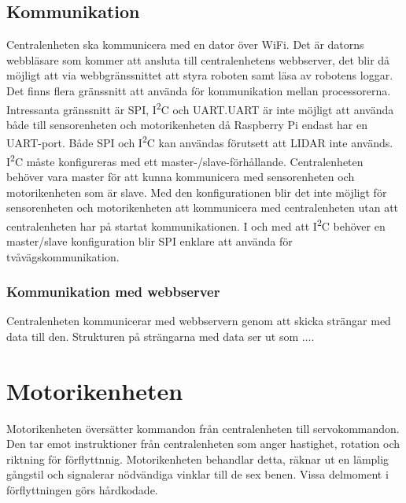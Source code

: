 \documentclass[a4paper,titlepage,12pt]{article}
\newcommand{\itc}{I\textsuperscript{2}C}
\begin{document}
	\subsection{Kommunikation}
	Centralenheten ska kommunicera med en dator över WiFi. Det är datorns webbläsare 
	som kommer att ansluta till centralenhetens webbserver, det blir då möjligt att
	via webbgränssnittet att styra roboten samt läsa av robotens loggar. Det finns
	flera gränssnitt att 
	använda för kommunikation mellan processorerna. Intressanta gränssnitt är SPI, 
	\itc{} och UART.\@ UART är inte möjligt att använda både till sensorenheten och 
	motorikenheten då Raspberry Pi endast har en UART-port. Både 
	SPI och \itc{} kan användas förutsett att LIDAR inte används. \itc{} måste konfigureras med ett
	master-/slave-förhållande. Centralenheten behöver vara master för att kunna
	kommunicera med 
	sensorenheten och motorikenheten som är slave. Med den konfigurationen blir 
	det inte möjligt för sensorenheten och motorikenheten att kommunicera med
	centralenheten utan att centralenheten har på startat kommunikationen. I och 
	med att \itc{} behöver en master/slave konfiguration blir SPI enklare att använda 
	för tvåvägskommunikation.
	
	\subsubsection{Kommunikation med webbserver}
	Centralenheten kommunicerar med webbservern genom att skicka strängar med data till den. Strukturen på strängarna med data ser ut som ....

	\section{Motorikenheten}
	Motorikenheten översätter kommandon från centralenheten till servokommandon. Den tar emot 
	instruktioner från centralenheten som anger hastighet, rotation och riktning för 
	förflyttnnig. Motorikenheten behandlar detta, räknar ut en lämplig gångstil och 
	signalerar nödvändiga vinklar till de sex benen. Vissa delmoment i förflyttningen 
	görs hårdkodade. 
	
\end{document}
